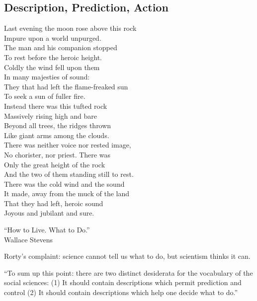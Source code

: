 \documentclass[11pt,twoside]{article}
\begin{document}
\subsection{Description, Prediction, Action}

\epigraph{%
Last evening the moon rose above this rock \\
Impure upon a world unpurged. \\
The man and his companion stopped \\
To rest before the heroic height. \\
\vspace{4pt}
Coldly the wind fell upon them \\
In many majesties of sound: \\
They that had left the flame-freaked sun \\
To seek a sun of fuller fire. \\
\vspace{4pt}
Instead there was this tufted rock \\
Massively rising high and bare \\
Beyond all trees, the ridges thrown \\
Like giant arms among the clouds. \\
\vspace{4pt}
There was neither voice nor rested image, \\
No chorister, nor priest. There was \\
Only the great height of the rock \\
And the two of them standing still to rest. \\
\vspace{4pt}
There was the cold wind and the sound \\
It made, away from the muck of the land \\
That they had left, heroic sound \\
Joyous and jubilant and sure.%
}{``How to Live. What to Do.''\\
Wallace Stevens}


Rorty's complaint: science cannot tell us what to do, but scientism
thinks it can.

``To sum up this point: there are two distinct desiderata for the vocabulary of the social sciences:
(1) It should contain descriptions which permit prediction and control
(2) It should contain descriptions which help one decide what to do.''
\cite[p. 75]{rorty_method_1981}

\cite{rorty_representation_1988}
\end{document}
